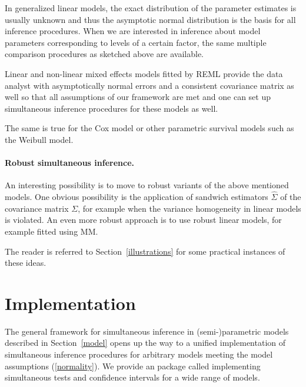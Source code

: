 \documentclass[12pt]{article}
\begin{document}
In generalized linear models, the exact distribution of the parameter estimates
is usually unknown and thus the asymptotic normal distribution is the basis for all
inference procedures. When we are interested in inference about model
parameters corresponding to levels of a certain factor, the same multiple 
comparison procedures as sketched above are available. 

Linear and non-linear mixed effects models fitted by REML provide
the data analyst with asymptotically normal errors and a consistent
covariance matrix as well so that all assumptions of our framework
are met and one can set up simultaneous inference procedures
for these models as well.

The same is true for the Cox model or other parametric survival models
such as the Weibull model.

\paragraph{Robust simultaneous inference.}

An interesting possibility is to move to robust variants of the above
mentioned models. One obvious possibility is the application
of sandwich estimators $\hat{\Sigma}$ of the covariance matrix $\Sigma$, 
for example when the variance homogeneity in linear models is violated.
An even more robust approach is to use robust linear models, for example
fitted using MM.

The reader is referred to Section~\ref{illustrations} for some practical
instances of these ideas.

\section{Implementation} \label{implementation}

The general framework for simultaneous inference in 
(semi-)parametric models described in Section~\ref{model}
opens up the way to a unified implementation of simultaneous inference
procedures for arbitrary models meeting the model assumptions 
(\ref{normality}). We provide an \RR{} \citep{R2007} package called 
 \citep{pkg:multcomp} implementing
simultaneous tests and confidence intervals for a wide range of models.
\end{document}
